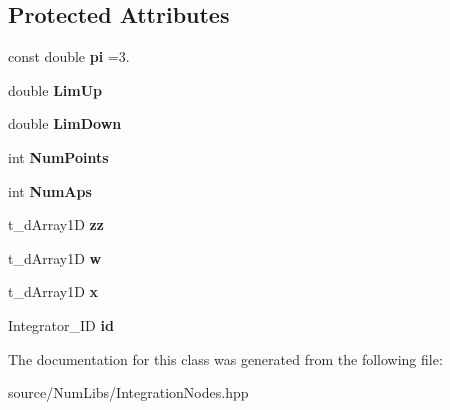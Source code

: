 \subsection*{Protected Attributes}
\begin{DoxyCompactItemize}
\item 
\hypertarget{class_c___integration_nodes_a2db6e5b500d59df584a1556fd2e928f4}{const double {\bfseries pi} =3.}\label{class_c___integration_nodes_a2db6e5b500d59df584a1556fd2e928f4}

\item 
\hypertarget{class_c___integration_nodes_a9d7f3f12030b61afb7d11ff833b92ab2}{double {\bfseries Lim\-Up}}\label{class_c___integration_nodes_a9d7f3f12030b61afb7d11ff833b92ab2}

\item 
\hypertarget{class_c___integration_nodes_aa2b7209a4f2aa65d90ca2cc1f22655ab}{double {\bfseries Lim\-Down}}\label{class_c___integration_nodes_aa2b7209a4f2aa65d90ca2cc1f22655ab}

\item 
\hypertarget{class_c___integration_nodes_a2aae6c2f677378b02fe1dd72137d5649}{int {\bfseries Num\-Points}}\label{class_c___integration_nodes_a2aae6c2f677378b02fe1dd72137d5649}

\item 
\hypertarget{class_c___integration_nodes_a1bf574f9151846abaeb89c2a9acca173}{int {\bfseries Num\-Aps}}\label{class_c___integration_nodes_a1bf574f9151846abaeb89c2a9acca173}

\item 
\hypertarget{class_c___integration_nodes_abced67ac9650b49ca756fe34b0aa593a}{t\-\_\-d\-Array1\-D {\bfseries zz}}\label{class_c___integration_nodes_abced67ac9650b49ca756fe34b0aa593a}

\item 
\hypertarget{class_c___integration_nodes_a023a6f295be0574aca58f8a67ac6263d}{t\-\_\-d\-Array1\-D {\bfseries w}}\label{class_c___integration_nodes_a023a6f295be0574aca58f8a67ac6263d}

\item 
\hypertarget{class_c___integration_nodes_ac7482a184d19e0ec9bf62a99edd9e29b}{t\-\_\-d\-Array1\-D {\bfseries x}}\label{class_c___integration_nodes_ac7482a184d19e0ec9bf62a99edd9e29b}

\item 
\hypertarget{class_c___integration_nodes_a1c7d0366d7ce1134f6a4c0944f80803b}{Integrator\-\_\-\-I\-D {\bfseries id}}\label{class_c___integration_nodes_a1c7d0366d7ce1134f6a4c0944f80803b}

\end{DoxyCompactItemize}


The documentation for this class was generated from the following file\-:\begin{DoxyCompactItemize}
\item 
source/\-Num\-Libs/Integration\-Nodes.\-hpp\end{DoxyCompactItemize}
